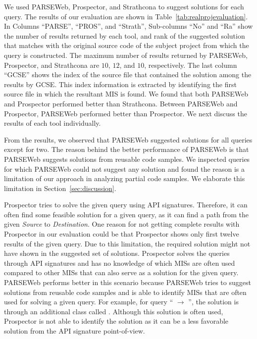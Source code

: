 \documentclass{fp035-thummalapenta}
\begin{document}
We used PARSEWeb, Prospector, and Strathcona to suggest solutions
for each query. The results of our evaluation are shown in
Table~\ref{tab:realprojevaluation}. 
In Columns ``PARSE'', ``PROS'', and ``Strath'',
Sub-columns ``No'' and ``Ra'' show the
number of results returned by each tool, and rank of the suggested
solution that matches with the original source code of the subject
project from which the query is constructed. The maximum number of
results returned by PARSEWeb, Prospector, and Strathcona are $10$, $12$,
and $10$, respectively. The last column ``GCSE'' shows the index of the
source file that contained the solution among the results by GCSE.
This index information is extracted by identifying the first source
file in which the resultant MIS is found.
We found that both PARSEWeb and Prospector performed better than
Strathcona. Between PARSEWeb and Prospector, PARSEWeb performed
better than Prospector. We next discuss the results of each tool individually.

From the results, we observed that PARSEWeb suggested solutions for all queries except for two.
The reason behind the better performance of PARSEWeb
is that PARSEWeb suggests solutions from reusable code samples.
We inspected queries for which PARSEWeb could not suggest any solution and found the reason
is a limitation of our approach in analyzing partial code samples.
We elaborate this limitation in Section~\ref{sec:discussion}.

Prospector tries to solve the given query using API signatures.
Therefore, it can often find some feasible solution for a given
query, as it can find a path from the given \emph{Source} to
\emph{Destination}. One reason for not getting complete results with
Prospector in our evaluation could be that Prospector shows only
first twelve results of the given query. Due to this limitation, the
required solution might not have shown in the suggested set of
solutions. Prospector solves the queries through API signatures and
has no knowledge of which MISs are often used compared to other
MISs that can also serve as a solution for the given query. PARSEWeb
performs better in this scenario because PARSEWeb tries to suggest
solutions from reusable code samples and is able to identify MISs
that are often used for solving a given query. For example, for
query `` $\rightarrow$ '', the
solution is through an additional class called . Although
this solution is often used, Prospector is not able to identify the
solution as it can be a less favorable solution from the API signature point-of-view.
\end{document}
